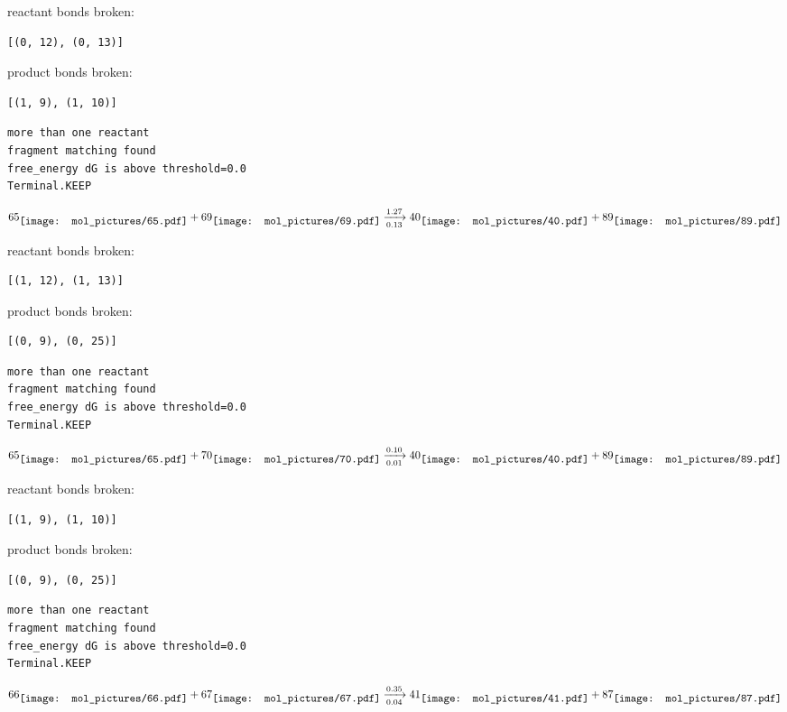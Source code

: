\documentclass{article}
\begin{document}
reactant bonds broken:\begin{verbatim}
[(0, 12), (0, 13)]
\end{verbatim}
product bonds broken:\begin{verbatim}
[(1, 9), (1, 10)]
\end{verbatim}




\vspace{1cm}
\begin{verbatim}
more than one reactant
fragment matching found
free_energy dG is above threshold=0.0
Terminal.KEEP
\end{verbatim}
$$
65
\raisebox{-.5\height}{\texttt{[image: mol\_pictures/65.pdf]}}
+
69
\raisebox{-.5\height}{\texttt{[image: mol\_pictures/69.pdf]}}
\xrightarrow[0.13]{1.27}
40
\raisebox{-.5\height}{\texttt{[image: mol\_pictures/40.pdf]}}
+
89
\raisebox{-.5\height}{\texttt{[image: mol\_pictures/89.pdf]}}
$$


reactant bonds broken:\begin{verbatim}
[(1, 12), (1, 13)]
\end{verbatim}
product bonds broken:\begin{verbatim}
[(0, 9), (0, 25)]
\end{verbatim}




\vspace{1cm}
\begin{verbatim}
more than one reactant
fragment matching found
free_energy dG is above threshold=0.0
Terminal.KEEP
\end{verbatim}
$$
65
\raisebox{-.5\height}{\texttt{[image: mol\_pictures/65.pdf]}}
+
70
\raisebox{-.5\height}{\texttt{[image: mol\_pictures/70.pdf]}}
\xrightarrow[0.01]{0.10}
40
\raisebox{-.5\height}{\texttt{[image: mol\_pictures/40.pdf]}}
+
89
\raisebox{-.5\height}{\texttt{[image: mol\_pictures/89.pdf]}}
$$


reactant bonds broken:\begin{verbatim}
[(1, 9), (1, 10)]
\end{verbatim}
product bonds broken:\begin{verbatim}
[(0, 9), (0, 25)]
\end{verbatim}




\vspace{1cm}
\begin{verbatim}
more than one reactant
fragment matching found
free_energy dG is above threshold=0.0
Terminal.KEEP
\end{verbatim}
$$
66
\raisebox{-.5\height}{\texttt{[image: mol\_pictures/66.pdf]}}
+
67
\raisebox{-.5\height}{\texttt{[image: mol\_pictures/67.pdf]}}
\xrightarrow[0.04]{0.35}
41
\raisebox{-.5\height}{\texttt{[image: mol\_pictures/41.pdf]}}
+
87
\raisebox{-.5\height}{\texttt{[image: mol\_pictures/87.pdf]}}
$$
\end{document}
